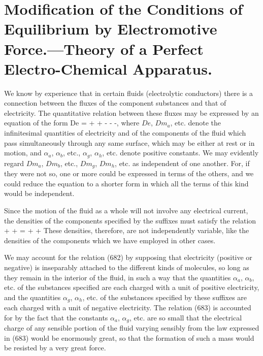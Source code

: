 \documentclass[12pt]{memoir}
\begin{document}
\section{Modification of the Conditions of Equilibrium  by Electromotive Force.---Theory of a Perfect Electro-Chemical Apparatus.}
We know by experience that in certain fluids (electrolytic conductors) there is a connection between the fluxes of the component substances and that of electricity. The quantitative relation between these fluxes may be expressed by an equation of the form
\eqs De = +  + -  -  -,    \label{682} \eqe
where $De$, $Dm_a$, etc. denote the infinitesimal quantities of electricity and of the components of the fluid which pass simultaneously through any same surface, which may be either at rest or in motion, and $\alpha_a$, $\alpha_b$, etc., $\alpha_g$, $\alpha_h$, etc. denote positive constants. We may evidently regard $Dm_a$, $Dm_b$, etc., $Dm_g$, $Dm_h$, etc. as independent of one another. For, if they were not so, one or more could be expressed in terms of the others, and we could reduce the equation to a shorter form in which all the terms of this kind would be independent.

Since the motion of the fluid as a whole will not involve any electrical current, the densities of the components specified by the suffixes must satisfy the relation
\eqs {} + +  =  + +     \label{683} \eqe
These densities, therefore, are not independently variable, like the densities of the components which we have employed in other cases.

We may account for the relation (682) by supposing that electricity (positive or negative) is inseparably attached to the different kinds of molecules, so long as they remain in the interior of the fluid, in such a way that the quantities $\alpha_a$, $\alpha_b$, etc. of the substances specified are each charged with a unit of positive electricity, and the quantities $\alpha_g$, $\alpha_h$, etc. of the substances specified by these suffixes are each charged with a unit of negative electricity. The relation (683) is accounted for by the fact that the constants $\alpha_a$, $\alpha_g$, etc. are so small that the electrical charge of any sensible portion of the fluid varying sensibly from the law  expressed in (683) would be enormously great, so that the formation of such a mass would be resisted by a very great force.
\end{document}
